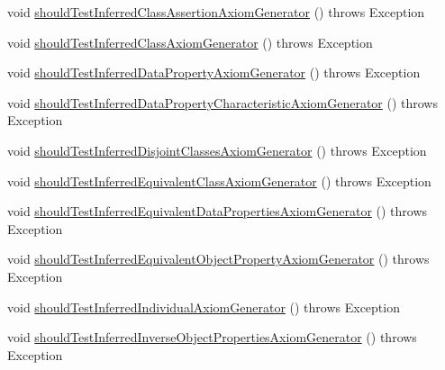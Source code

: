 \begin{DoxyCompactItemize}
\item 
void \hyperlink{classorg_1_1semanticweb_1_1owlapi_1_1contract_1_1_contract_owlapi_util_test_a1240444a4363619e63675aa9004e4327}{should\-Test\-Inferred\-Class\-Assertion\-Axiom\-Generator} ()  throws Exception 
\item 
void \hyperlink{classorg_1_1semanticweb_1_1owlapi_1_1contract_1_1_contract_owlapi_util_test_ae8aceea2109ebc3029742ca1dbbb128d}{should\-Test\-Inferred\-Class\-Axiom\-Generator} ()  throws Exception 
\item 
void \hyperlink{classorg_1_1semanticweb_1_1owlapi_1_1contract_1_1_contract_owlapi_util_test_a592fcb2b1e1003a8dbd76853e2c3421f}{should\-Test\-Inferred\-Data\-Property\-Axiom\-Generator} ()  throws Exception 
\item 
void \hyperlink{classorg_1_1semanticweb_1_1owlapi_1_1contract_1_1_contract_owlapi_util_test_a55b373796e32c36ca911a45229ff8fd4}{should\-Test\-Inferred\-Data\-Property\-Characteristic\-Axiom\-Generator} ()  throws Exception 
\item 
void \hyperlink{classorg_1_1semanticweb_1_1owlapi_1_1contract_1_1_contract_owlapi_util_test_a1134225039f29bd3cfd71be174a89364}{should\-Test\-Inferred\-Disjoint\-Classes\-Axiom\-Generator} ()  throws Exception 
\item 
void \hyperlink{classorg_1_1semanticweb_1_1owlapi_1_1contract_1_1_contract_owlapi_util_test_ad84971018bdf76d3118281a31f1e1ac3}{should\-Test\-Inferred\-Equivalent\-Class\-Axiom\-Generator} ()  throws Exception 
\item 
void \hyperlink{classorg_1_1semanticweb_1_1owlapi_1_1contract_1_1_contract_owlapi_util_test_a07384113c9705a8781aac81a4116ea0f}{should\-Test\-Inferred\-Equivalent\-Data\-Properties\-Axiom\-Generator} ()  throws Exception 
\item 
void \hyperlink{classorg_1_1semanticweb_1_1owlapi_1_1contract_1_1_contract_owlapi_util_test_a78500369d96aed1e1412ab0c9c4d2439}{should\-Test\-Inferred\-Equivalent\-Object\-Property\-Axiom\-Generator} ()  throws Exception 
\item 
void \hyperlink{classorg_1_1semanticweb_1_1owlapi_1_1contract_1_1_contract_owlapi_util_test_ae80904bf43adbfd5f046f7fe3c4a09a9}{should\-Test\-Inferred\-Individual\-Axiom\-Generator} ()  throws Exception 
\item 
void \hyperlink{classorg_1_1semanticweb_1_1owlapi_1_1contract_1_1_contract_owlapi_util_test_ae10ce92a8fa3fda0ff21b84bc0f74bbe}{should\-Test\-Inferred\-Inverse\-Object\-Properties\-Axiom\-Generator} ()  throws Exception 
\item 

\end{DoxyCompactItemize}
